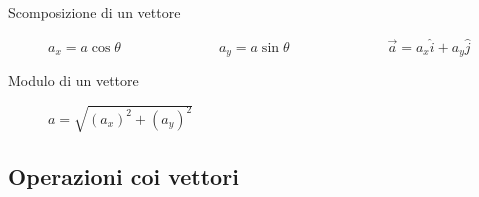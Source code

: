 \documentclass[a4paper,11pt,italian]{article}
\begin{document}
\begin{description}
  
  
  \item[Scomposizione di un vettore] $ a_x = a  \cos\theta $~~~~~~~~~~~~~~$ a_y = a  \sin\theta $~~~~~~~~~~~~~~$ \vec{a} = a_x \hat{i} + a_y \hat{j} $
  
  \item[Modulo di un vettore] $ a = \sqrt{(a_x)^2 + (a_y)^2} $
\end{description}

\subsection{Operazioni coi vettori}
\end{document}
